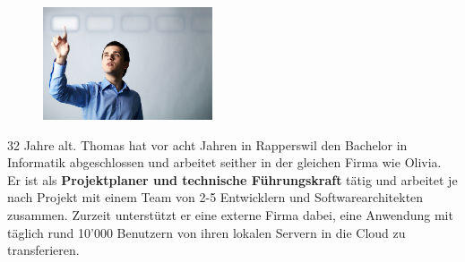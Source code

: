 \begin{description}
\begin{minipage}[t]{0.35\textwidth}
\begin{figure}[H]
						\includegraphics[trim=0cm 0cm 0cm 0cm, clip=true, width=5cm]{requirements/media/img/thomasBucher.jpg}
						\caption[Symbolbild Persona Thomas Bucher\newline
						]
						{\label{Thomas Bucher}}
					\end{figure}
				\end{minipage}
				\begin{minipage}[t]{0.55\textwidth}
					32 Jahre alt.
					Thomas hat vor acht Jahren in Rapperswil den Bachelor in Informatik abgeschlossen und arbeitet seither in der gleichen Firma wie Olivia.
					Er ist als \textbf{Projektplaner und technische Führungskraft} tätig und
					arbeitet je nach Projekt mit einem Team von 2-5 Entwicklern und Softwarearchitekten zusammen.
					Zurzeit unterstützt er eine externe Firma dabei,
					eine Anwendung mit täglich rund 10'000 Benutzern von ihren lokalen Servern in die Cloud zu transferieren.
				\end{minipage}
		\end{description}
		
